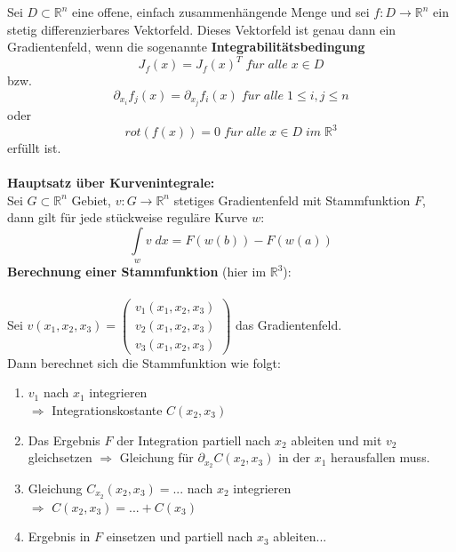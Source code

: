 \documentclass[a4paper,twocolumn,10pt]{article}
\begin{document}
Sei $D\subset\mathbb{R}^n$ eine offene, einfach zusammenhängende Menge und sei $f:D\rightarrow\mathbb{R}^n$ ein stetig differenzierbares Vektorfeld. Dieses Vektorfeld ist genau dann ein Gradientenfeld, wenn die sogenannte \textbf{Integrabilitätsbedingung}
\begin{equation*}
J_f(x)=J_f(x)^T\;f\ddot{u}r\;alle\;x\in D
\end{equation*}
bzw.
\begin{equation*}
\partial_{x_i}f_j(x)=\partial_{x_j}f_i(x)\;f\ddot{u}r\;alle\;1\leq i,j\leq n
\end{equation*}
oder
\begin{equation*}
rot(f(x))=0\;f\ddot{u}r\;alle\;x\in D\;im\;\mathbb{R}^3
\end{equation*}
erfüllt ist.\\\\
\textbf{Hauptsatz über Kurvenintegrale:}\\
Sei $G\subset\mathbb{R}^n$ Gebiet, $v:G\rightarrow\mathbb{R}^n$ stetiges Gradientenfeld mit Stammfunktion $F$, dann gilt für jede stückweise reguläre Kurve $w$:
\begin{equation*}
\int\limits_{w}v\;dx=F(w(b))-F(w(a))
\end{equation*}
\textbf{Berechnung einer Stammfunktion} (hier im $\mathbb{R}^3$):\\\\
Sei $v(x_1,x_2,x_3)=\begin{pmatrix}v_1(x_1,x_2,x_3) \\ v_2(x_1,x_2,x_3) \\ v_3(x_1,x_2,x_3)\end{pmatrix}$ das Gradientenfeld.\\
Dann berechnet sich die Stammfunktion wie folgt:
\begin{enumerate}
\item $v_1$ nach $x_1$ integrieren\\
$\Rightarrow$ Integrationskostante $C(x_2,x_3)$
\item Das Ergebnis $F$ der Integration partiell nach $x_2$ ableiten und mit $v_2$ gleichsetzen $\Rightarrow$ Gleichung für $\partial_{x_2}C(x_2,x_3)$ in der $x_1$ herausfallen muss.
\item Gleichung $C_{x_2}(x_2,x_3)=...$ nach $x_2$ integrieren\\
$\Rightarrow$ $C(x_2,x_3)=...+C(x_3)$
\item Ergebnis in $F$ einsetzen und partiell nach $x_3$ ableiten...
\end{enumerate}
\end{document}
